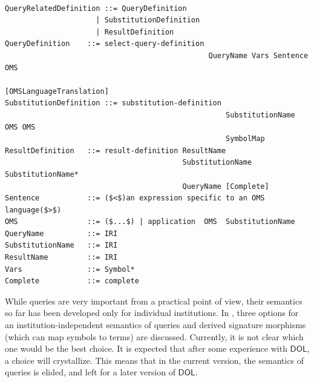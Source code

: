 \documentclass[10pt, a4paper]{isov2}
\newcommand*{\syntax}[1]{\texttt{#1}}
\newcommand{\semdom}[1]{
\begin{center}
\fbox{$#1$}
\end{center}
}
\newcommand*{\DOL}{\ensuremath{\mathsf{DOL}}\xspace}
\begin{document}
\begin{lstlisting}[language=ebnf,escapeinside={()},mathescape]  % abstract syntax

QueryRelatedDefinition ::= QueryDefinition
                     | SubstitutionDefinition
                     | ResultDefinition
QueryDefinition    ::= select-query-definition
                                               QueryName Vars Sentence OMS
                                               [OMSLanguageTranslation]
SubstitutionDefinition ::= substitution-definition
                                                   SubstitutionName OMS OMS
                                                   SymbolMap
ResultDefinition   ::= result-definition ResultName
                                         SubstitutionName SubstitutionName*
                                         QueryName [Complete]
Sentence           ::= ($<$)an expression specific to an OMS language($>$) 
OMS                ::= ($...$) | application  OMS  SubstitutionName 
QueryName          ::= IRI
SubstitutionName   ::= IRI
ResultName         ::= IRI
Vars               ::= Symbol*
Complete           ::= complete
\end{lstlisting}


\label{s:sem-queries}

While queries are very important from a practical point of view, their
semantics so far has been developed only for individual institutions.
In \cite{MossakowskiEtAl15a}, three options for an
institution-independent semantics of queries and derived signature
morphisms (which can map symbols to terms) are discussed. Currently,
it is not clear which one would be the best choice. It is expected
that after some experience with \DOL, a choice will crystallize. This
means that in the current version, the semantics of queries is
elided, and left for a later version of \DOL.

%
%
%
%
\end{document}
